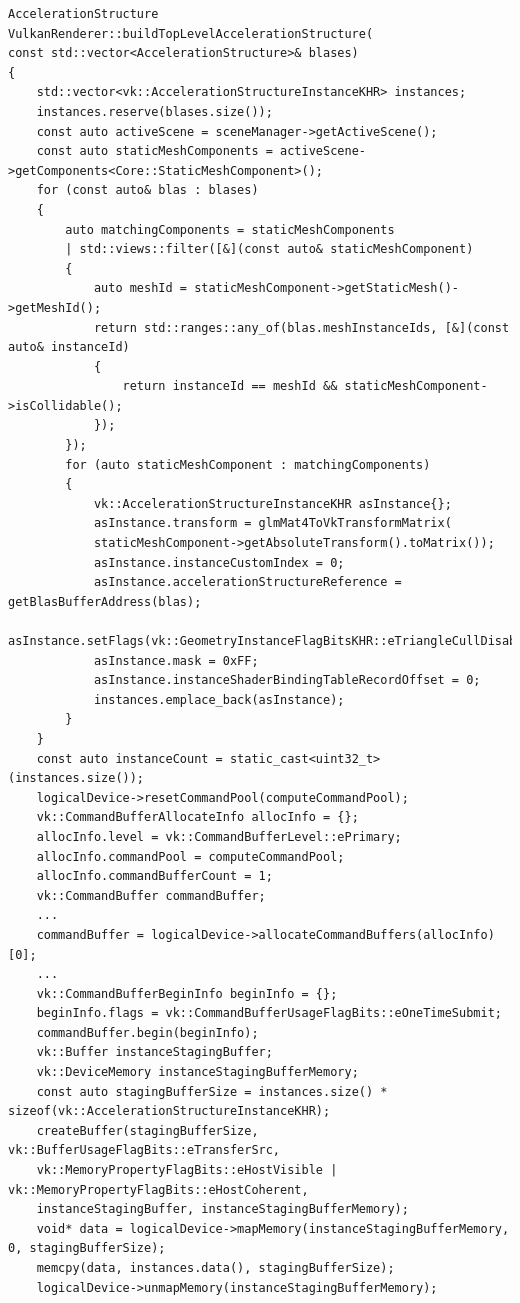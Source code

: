 \documentclass[11pt]{scrartcl}
\begin{document}
	\begin{lstlisting}[caption={Erzeugung der Top-Level Acceleration Structure in VulkanRenderer.cpp},label={lst:listing-vulkan-createtlascpp}]
AccelerationStructure VulkanRenderer::buildTopLevelAccelerationStructure(
const std::vector<AccelerationStructure>& blases)
{
	std::vector<vk::AccelerationStructureInstanceKHR> instances;
	instances.reserve(blases.size());
	const auto activeScene = sceneManager->getActiveScene();
	const auto staticMeshComponents = activeScene->getComponents<Core::StaticMeshComponent>();
	for (const auto& blas : blases)
	{
		auto matchingComponents = staticMeshComponents
		| std::views::filter([&](const auto& staticMeshComponent)
		{
			auto meshId = staticMeshComponent->getStaticMesh()->getMeshId();
			return std::ranges::any_of(blas.meshInstanceIds, [&](const auto& instanceId)
			{
				return instanceId == meshId && staticMeshComponent->isCollidable();
			});
		});
		for (auto staticMeshComponent : matchingComponents)
		{
			vk::AccelerationStructureInstanceKHR asInstance{};
			asInstance.transform = glmMat4ToVkTransformMatrix(
			staticMeshComponent->getAbsoluteTransform().toMatrix());
			asInstance.instanceCustomIndex = 0;
			asInstance.accelerationStructureReference = getBlasBufferAddress(blas);
			asInstance.setFlags(vk::GeometryInstanceFlagBitsKHR::eTriangleCullDisable);
			asInstance.mask = 0xFF;
			asInstance.instanceShaderBindingTableRecordOffset = 0;
			instances.emplace_back(asInstance);
		}
	}
	const auto instanceCount = static_cast<uint32_t>(instances.size());
	logicalDevice->resetCommandPool(computeCommandPool);
	vk::CommandBufferAllocateInfo allocInfo = {};
	allocInfo.level = vk::CommandBufferLevel::ePrimary;
	allocInfo.commandPool = computeCommandPool;
	allocInfo.commandBufferCount = 1;
	vk::CommandBuffer commandBuffer;
	...
	commandBuffer = logicalDevice->allocateCommandBuffers(allocInfo)[0];
	...
	vk::CommandBufferBeginInfo beginInfo = {};
	beginInfo.flags = vk::CommandBufferUsageFlagBits::eOneTimeSubmit;
	commandBuffer.begin(beginInfo);
	vk::Buffer instanceStagingBuffer;
	vk::DeviceMemory instanceStagingBufferMemory;
	const auto stagingBufferSize = instances.size() * sizeof(vk::AccelerationStructureInstanceKHR);
	createBuffer(stagingBufferSize, vk::BufferUsageFlagBits::eTransferSrc,
	vk::MemoryPropertyFlagBits::eHostVisible | vk::MemoryPropertyFlagBits::eHostCoherent,
	instanceStagingBuffer, instanceStagingBufferMemory);
	void* data = logicalDevice->mapMemory(instanceStagingBufferMemory, 0, stagingBufferSize);
	memcpy(data, instances.data(), stagingBufferSize);
	logicalDevice->unmapMemory(instanceStagingBufferMemory);

\end{lstlisting}
\end{document}
